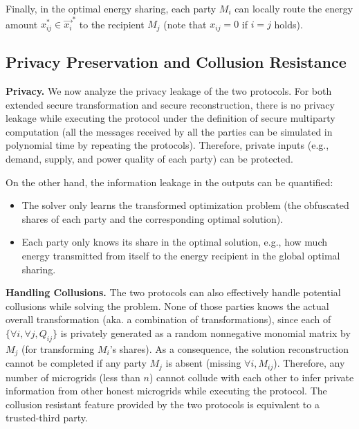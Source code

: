 Finally, in the optimal energy sharing, each party $M_i$ can locally route the energy amount $x_{ij}^*\in \vec{x_i}^*$ to the recipient $M_j$ (note that $x_{ij}=0$ if $i=j$ holds).


\subsection{Privacy Preservation and Collusion Resistance}

\noindent\textbf{Privacy.} We now analyze the privacy leakage of the two protocols. For both extended secure transformation and secure reconstruction, there is no privacy leakage while executing the protocol under the definition of secure multiparty computation \cite{Yao86,Goldreich87} (all the messages received by all the parties can be simulated in polynomial time by repeating the protocols). Therefore, private inputs (e.g., demand, supply, and power quality of each party) can be protected. 

On the other hand, the information leakage in the outputs can be quantified:

\begin{itemize}
	\item The solver only learns the transformed optimization problem (the obfuscated shares of each party and the corresponding optimal solution).
	\item Each party only knows its share in the optimal solution, e.g., how much energy transmitted from itself to the energy recipient in the global optimal sharing.
\end{itemize}


\noindent\textbf{Handling Collusions.} The two protocols can also effectively handle potential collusions while solving the problem. None of those parties knows the actual overall transformation (aka. a combination of transformations), since each of $\{\forall i, \forall j, Q_{ij}\}$ is privately generated as a random nonnegative monomial matrix by $M_j$ (for transforming $M_i$'s shares). As a consequence, the solution reconstruction cannot be completed if any party $M_j$ is absent (missing $\forall i, M_{ij}$). Therefore, any number of microgrids (less than $n$) cannot collude with each other to infer private information from other honest microgrids while executing the protocol. The collusion resistant feature provided by the two protocols is equivalent to a trusted-third party. 